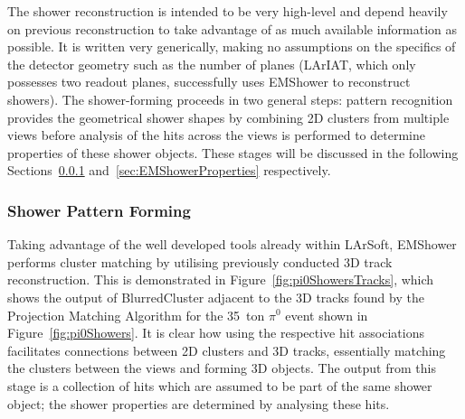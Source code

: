 The shower reconstruction is intended to be very high-level and depend heavily on previous reconstruction to take advantage of as much available information as possible.  It is written very generically, making no assumptions on the specifics of the detector geometry such as the number of planes (LArIAT, which only possesses two readout planes, successfully uses EMShower to reconstruct showers).  The shower-forming proceeds in two general steps: pattern recognition provides the geometrical shower shapes by combining 2D clusters from multiple views before analysis of the hits across the views is performed to determine properties of these shower objects.  These stages will be discussed in the following Sections~\ref{sec:EMShowerPattern} and~\ref{sec:EMShowerProperties} respectively.

\subsubsection{Shower Pattern Forming}\label{sec:EMShowerPattern}

Taking advantage of the well developed tools already within LArSoft, EMShower performs cluster matching by utilising previously conducted 3D track reconstruction.  This is demonstrated in Figure~\ref{fig:pi0ShowersTracks}, which shows the output of BlurredCluster adjacent to the 3D tracks found by the Projection Matching Algorithm for the 35~ton $\pi^0$ event shown in Figure~\ref{fig:pi0Showers}.  It is clear how using the respective hit associations facilitates connections between 2D clusters and 3D tracks, essentially matching the clusters between the views and forming 3D objects.  The output from this stage is a collection of hits which are assumed to be part of the same shower object; the shower properties are determined by analysing these hits.

